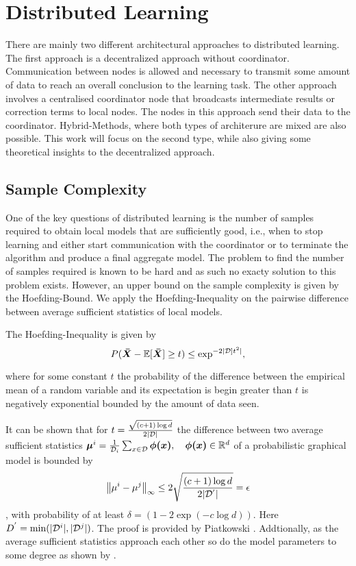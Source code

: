 \section{Distributed Learning}
There are mainly two different architectural approaches to distributed learning. 
The first approach is a decentralized approach without coordinator.
Communication between nodes is allowed and necessary to transmit some amount of data to reach an overall conclusion to the learning task.
The other approach involves a centralised coordinator node that broadcasts intermediate results or correction terms to local nodes.
The nodes in this approach send their data to the coordinator. 
Hybrid-Methods, where both types of architerure are mixed are also possible.
This work will focus on the second type, while also giving some theoretical insights to the decentralized approach.

\subsection{Sample Complexity}
One of the key questions of distributed learning is the number of samples required to obtain local models that are sufficiently good, i.e., when to stop learning and either start communication with the coordinator
or to terminate the algorithm and produce a final aggregate model. 
The problem to find the number of samples required is known to be hard  and as such no exacty solution to this problem exists.
However, an upper bound on the sample complexity is given by the Hoefding-Bound. 
We apply the Hoefding-Inequality on the pairwise difference between average sufficient statistics of local models.

The Hoefding-Inequality is given by
\begin{equation}
    P(\boldsymbol{\bar{X}} - \mathbb{E}[\boldsymbol{\bar{X}}] \geq t ) \leq \exp^{-2\lvert\mathcal{D}]t^2\rvert},
\end{equation}

where for some constant $t$ the probability of the difference between the empirical mean of a random variable and its expectation is begin greater than $t$ is negatively exponential bounded by the amount of data seen.

It can be shown that for $t = \frac{\sqrt{(c+1) \log d}}{2\lvert\mathcal{D}\rvert}$ the difference between two average sufficient statistics $\boldsymbol{\mu}^i = \frac{1}{\mathcal{D}_i} \sum_{x \in \mathcal{D}} \boldsymbol{\phi(x)}, \quad \boldsymbol{\phi(x)} \in \mathbb{R}^d$ of a probabilistic graphical model is bounded by
\begin{equation}
    \left\lVert\mu^{i} -  \mu^{j}\right\rVert_\infty \leq 2 \sqrt{
        \frac{(c+1) \log d}
        {2\lvert\mathcal{D^{'}}\rvert}
        } = \epsilon
\end{equation},
with probability of at least $\delta= (1- 2 \exp(-c \log d))$. Here $D^{'} = \min(\lvert\mathcal{D}^i\rvert, \lvert\mathcal{D}^j\rvert)$.
The proof is provided by Piatkowski \cite{piatkowski2019distributed}. 
Addtionally, as the average sufficient statistics approach each other so do the model parameters to some degree as shown by .

